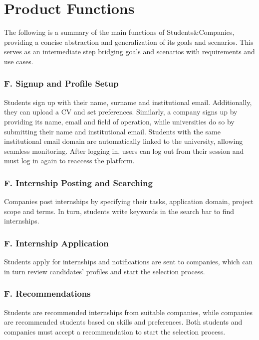 \section{Product Functions}
The following is a summary of the main functions of Students\&Companies, providing a concise abstraction and generalization of its goals and scenarios.
This serves as an intermediate step bridging goals and scenarios with requirements and use cases.

\setcounter{f}{1}
\newcommand{\fc}{\thef{}}

\subsubsection*{F\fc. Signup and Profile Setup}
Students sign up with their name, surname and institutional email.
Additionally, they can upload a CV and set preferences.
Similarly, a company signs up by providing its name, email and field of operation, while universities do so by submitting their name and institutional email.
Students with the same institutional email domain are automatically linked to the university, allowing seamless monitoring.
After logging in, users can log out from their session and must log in again to reaccess the platform.

\subsubsection*{F\fc. Internship Posting and Searching}
Companies post internships by specifying their tasks, application domain, project scope and terms.
In turn, students write keywords in the search bar to find internships.

\subsubsection*{F\fc. Internship Application}
Students apply for internships and notifications are sent to companies, which can in turn review candidates’ profiles and start the selection process.

\subsubsection*{F\fc. Recommendations}
Students are recommended internships from suitable companies, while companies are recommended students based on skills and preferences.
Both students and companies must accept a recommendation to start the selection process.

